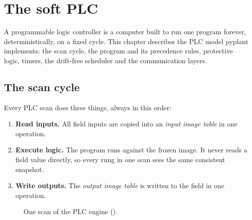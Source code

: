 \chapter{The soft PLC}
\label{ch:plc}

A programmable logic controller is a computer built to run one program
forever, deterministically, on a fixed cycle. This chapter describes the PLC
model pyplant implements: the scan cycle, the program and its precedence
rules, protective logic, timers, the drift-free scheduler and the
communication layers.

\section{The scan cycle}

Every PLC scan does three things, always in this order:

\begin{enumerate}
  \item \textbf{Read inputs.} All field inputs are copied into an
        \emph{input image table} in one operation.
  \item \textbf{Execute logic.} The program runs against the frozen image.
        It never reads a field value directly, so every rung in one scan sees
        the same consistent snapshot.
  \item \textbf{Write outputs.} The \emph{output image table} is written to
        the field in one operation.
\end{enumerate}

\begin{figure}[htbp]
\centering
{}
\caption{One scan of the PLC engine ().}
\label{fig:scan}
\end{figure}

